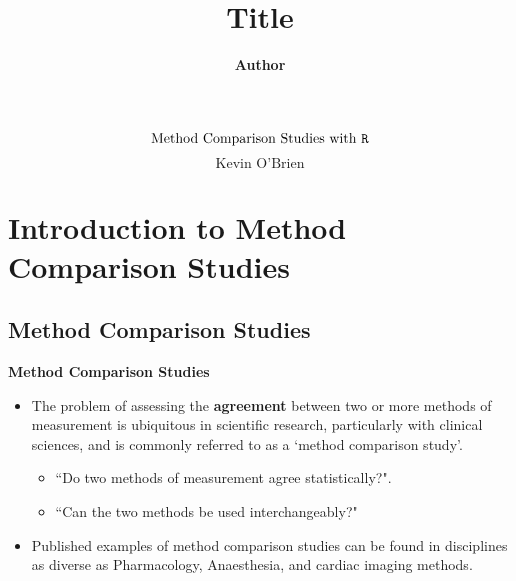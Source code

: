 \documentclass[compress]{beamer}        %
\title
{
{\huge Title\\[0.3cm] }
}
\author[Kevin O'Brien]{{\bf Author}}
\institute[University of Limerick, Maths \& Stats Dept]{}
\date{}
\makeatletter
\newcommand{\tcb}{\textcolor{beamer@blendedblue}}
\makeatother
\begin{document}
\begin{frame}
\huge
\[ \mbox{Method Comparison Studies with \texttt{R}} \]
\Large
\[ \mbox{Kevin O'Brien} \]
\end{frame}
\begin{frame}
\setcounter{tocdepth}{2}
\tableofcontents
\end{frame}

\section[Intro to MCS]{Introduction to Method Comparison Studies}
\subsection{Method Comparison Studies}
\begin{frame}
\large
\vspace{-1cm}
\textbf{Method Comparison Studies}
\begin{itemize}
\item The problem of assessing the \textbf{agreement} between two or more methods
of measurement is ubiquitous in scientific research, particularly with clinical sciences, and is
commonly referred to as a `method comparison study'. 
{
\Large
\begin{itemize}
\item ``Do two methods of measurement agree statistically?".
\item ``Can the two methods be used interchangeably?"
\end{itemize}
}

\item Published
examples of method comparison studies can be found in disciplines
as diverse as Pharmacology, Anaesthesia, and cardiac imaging methods.

\end{itemize}


\end{frame}
\end{document}
